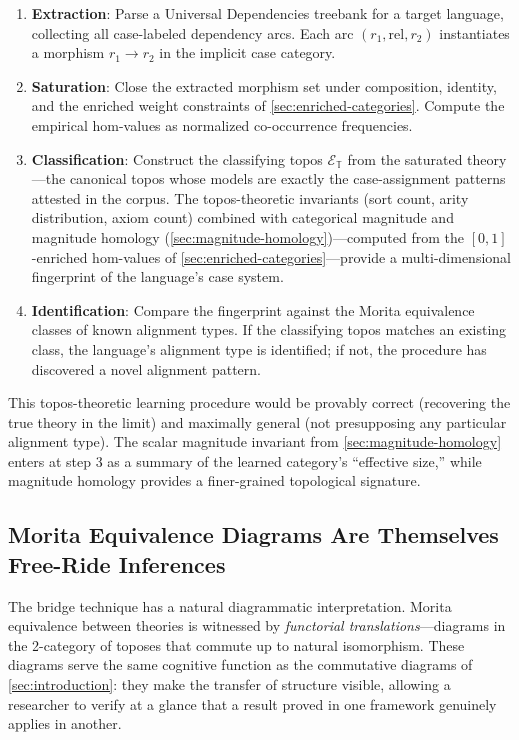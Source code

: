 \documentclass[
]{article}
\providecommand{\tightlist}{%
  \setlength{\itemsep}{0pt}\setlength{\parskip}{0pt}}
\begin{document}
\begin{enumerate}
\def\labelenumi{\arabic{enumi}.}
\tightlist
\item
  \textbf{Extraction}: Parse a Universal Dependencies treebank for a
  target language, collecting all case-labeled dependency arcs. Each arc
  \((r_1, \text{rel}, r_2)\) instantiates a morphism \(r_1 \to r_2\) in
  the implicit case category.
\item
  \textbf{Saturation}: Close the extracted morphism set under
  composition, identity, and the enriched weight constraints of
  \autoref{sec:enriched-categories}. Compute the empirical hom-values as
  normalized co-occurrence frequencies.
\item
  \textbf{Classification}: Construct the classifying topos
  \(\mathcal{E}_{\mathbb{T}}\) from the saturated theory---the canonical
  topos whose models are exactly the case-assignment patterns attested
  in the corpus. The topos-theoretic invariants (sort count, arity
  distribution, axiom count) combined with categorical magnitude and
  magnitude homology (\autoref{sec:magnitude-homology})---computed from
  the \([0,1]\)-enriched hom-values of
  \autoref{sec:enriched-categories}---provide a multi-dimensional
  fingerprint of the language's case system.
\item
  \textbf{Identification}: Compare the fingerprint against the Morita
  equivalence classes of known alignment types. If the classifying topos
  matches an existing class, the language's alignment type is
  identified; if not, the procedure has discovered a novel alignment
  pattern.
\end{enumerate}

This topos-theoretic learning procedure would be provably correct
(recovering the true theory in the limit) and maximally general (not
presupposing any particular alignment type). The scalar magnitude
invariant from \autoref{sec:magnitude-homology} enters at step 3 as a
summary of the learned category's ``effective size,'' while magnitude
homology provides a finer-grained topological signature.

\subsection{Morita Equivalence Diagrams Are Themselves Free-Ride
Inferences}\label{morita-equivalence-diagrams-are-themselves-free-ride-inferences}

The bridge technique has a natural diagrammatic interpretation. Morita
equivalence between theories is witnessed by \emph{functorial
translations}---diagrams in the 2-category of toposes that commute up to
natural isomorphism. These diagrams serve the same cognitive function as
the commutative diagrams of \autoref{sec:introduction}: they make the
transfer of structure visible, allowing a researcher to verify at a
glance that a result proved in one framework genuinely applies in
another.
\end{document}
